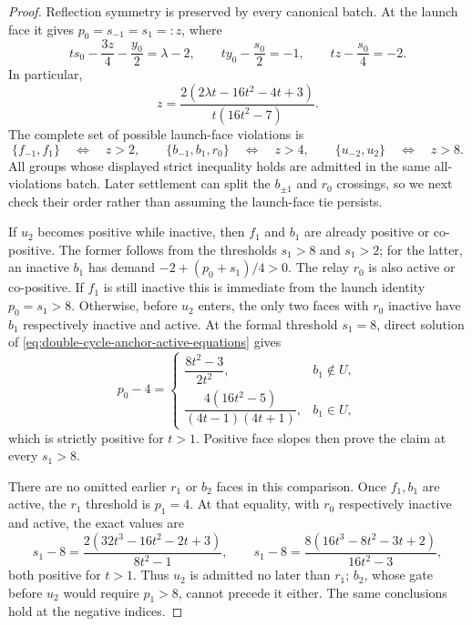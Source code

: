 \begin{proof}
Reflection symmetry is preserved by every canonical batch.  At the launch
face it gives $p_0=s_{-1}=s_1=:z$, where
\begin{equation*}
 t s_0-\frac{3z}{4}-\frac{y_0}{2}=\lambda-2,
 \qquad
 t y_0-\frac{s_0}{2}=-1,
 \qquad
 t z-\frac{s_0}{4}=-2.
\end{equation*}
In particular,
\begin{equation*}
 z=\frac{2(2\lambda t-16t^2-4t+3)}{t(16t^2-7)}.
\end{equation*}
The complete set of possible launch-face violations is
\begin{equation}
 \{f_{-1},f_1\}\quad\Longleftrightarrow\quad z>2,
 \qquad
 \{b_{-1},b_1,r_0\}\quad\Longleftrightarrow\quad z>4,
 \qquad
 \{u_{-2},u_2\}\quad\Longleftrightarrow\quad z>8.
 \label{eq:double-cycle-anchor-launch-gates}
\end{equation}
All groups whose displayed strict inequality holds are admitted in the same
all-violations batch.  Later settlement can split the $b_{\pm1}$ and $r_0$
crossings, so we next check their order rather than assuming the launch-face
tie persists.

If $u_2$ becomes positive while inactive, then $f_1$ and $b_1$ are already
positive or co-positive.  The former follows from the thresholds $s_1>8$
and $s_1>2$; for the latter, an inactive $b_1$ has demand
$-2+(p_0+s_1)/4>0$.  The relay $r_0$ is also active or co-positive.  If
$f_1$ is still inactive this is immediate from the launch identity
$p_0=s_1>8$.  Otherwise, before $u_2$ enters, the only two faces with $r_0$
inactive have $b_1$ respectively inactive and active.  At the formal
threshold $s_1=8$, direct solution of
\cref{eq:double-cycle-anchor-active-equations} gives
\begin{equation}
 p_0-4=
 \begin{cases}
 \dfrac{8t^2-3}{2t^2},&b_1\notin U,\\[5pt]
 \dfrac{4(16t^2-5)}{(4t-1)(4t+1)},&b_1\in U,
 \end{cases}
 \label{eq:double-cycle-anchor-precedence}
\end{equation}
which is strictly positive for $t>1$.  Positive face slopes then prove the
claim at every $s_1>8$.

There are no omitted earlier $r_1$ or $b_2$ faces in this comparison.  Once
$f_1,b_1$ are active, the $r_1$ threshold is $p_1=4$.  At that equality,
with $r_0$ respectively inactive and active, the exact values are
\begin{equation*}
 s_1-8=
 \frac{2(32t^3-16t^2-2t+3)}{8t^2-1},
 \qquad
 s_1-8=
 \frac{8(16t^3-8t^2-3t+2)}{16t^2-3},
\end{equation*}
both positive for $t>1$.  Thus $u_2$ is admitted no later than $r_1$;
$b_2$, whose gate before $u_2$ would require $p_1>8$, cannot precede it
either.  The same conclusions hold at the negative indices.


\end{proof}
